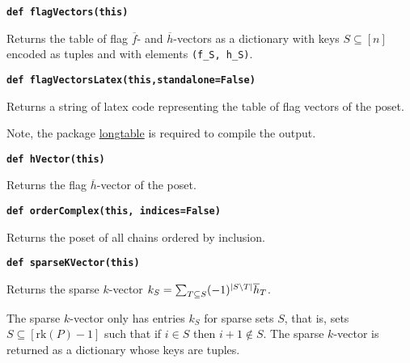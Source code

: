 \documentclass[12pt]{article}
\begin{document}
\begin{child}
{{}\endlist}

\textbf{\hypertarget{Poset.flagVectors}{\texttt{def flagVectors(this)}}}
{\list{}{\leftmargin 0.5cm}\item{
Returns the table of flag $\overline{f}$- and $\overline{h}$-vectors as a dictionary with keys $S\subseteq[n]$ encoded as tuples and with elements \verb|(f_S, h_S)|.


}\endlist}

\textbf{\hypertarget{Poset.flagVectorsLatex}{\texttt{def flagVectorsLatex(this,standalone=False)}}}
{\list{}{\leftmargin 0.5cm}\item{
Returns a string of latex code representing the table of flag vectors of the poset.

Note, the package \href{https://ctan.org/pkg/longtable}{longtable} is required to compile the output.


}\endlist}

\textbf{\hypertarget{Poset.hVector}{\texttt{def hVector(this)}}}
{\list{}{\leftmargin 0.5cm}\item{
Returns the flag $\overline{h}$-vector of the poset.


}\endlist}

\textbf{\hypertarget{Poset.orderComplex}{\texttt{def orderComplex(this, indices=False)}}}
{\list{}{\leftmargin 0.5cm}\item{
Returns the poset of all chains ordered by inclusion.


}\endlist}

\textbf{\hypertarget{Poset.sparseKVector}{\texttt{def sparseKVector(this)}}}
{\list{}{\leftmargin 0.5cm}\item{
Returns the sparse $k$-vector $k_S = \sum_{T\subseteq S}(-1)^{\lvert{S\setminus T}\rvert}\overline{h}_T$.

The sparse $k$-vector only has entries $k_S$ for sparse sets $S$,
that is, sets $S\subseteq[\text{rk}(P)-1]$ such that if $i\in S$ then $i+1\not\in S$.
The sparse $k$-vector is returned as a dictionary whose keys are tuples.


}\endlist}


\end{child}
\end{document}
